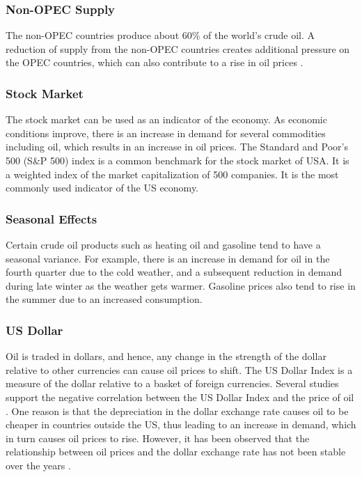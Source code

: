 \documentclass[runningheads]{llncs}
\begin{document}
\subsubsection{Non-OPEC Supply}
The non-OPEC countries produce about 60\% of the world's crude oil. A reduction of supply from the non-OPEC countries creates additional pressure on the OPEC countries, which can also contribute to a rise in oil prices \cite{eiafactors}.

\subsubsection{Stock Market}
The stock market can be used as an indicator of the economy. As economic conditions improve, there is an increase in demand for several commodities including oil, which results in an increase in oil prices. The Standard and Poor's 500 (S\&P 500) index is a common benchmark for the stock market of USA. It is a weighted index of the market capitalization of 500 companies. It is the most commonly used indicator of the US economy.

\subsubsection{Seasonal Effects}
Certain crude oil products such as heating oil and gasoline tend to have a seasonal variance. For example, there is an increase in demand for oil in the fourth quarter due to the cold weather, and a subsequent reduction in demand during late winter as the weather gets warmer. Gasoline prices also tend to rise in the summer due to an increased consumption. 

\subsubsection{US Dollar}
Oil is traded in dollars, and hence, any change in the strength of the dollar relative to other currencies can cause oil prices to shift. The US Dollar Index is a measure of the dollar relative to a basket of foreign currencies. Several studies support the negative correlation between the US Dollar Index and the price of oil \cite{eiafactors} \cite{oildollar}. One reason is that the depreciation in the dollar exchange rate causes oil to be cheaper in countries outside the US, thus leading to an increase in demand, which in turn causes oil prices to rise. However, it has been observed that the relationship between oil prices and the dollar exchange rate has not been stable over the years .
\end{document}
